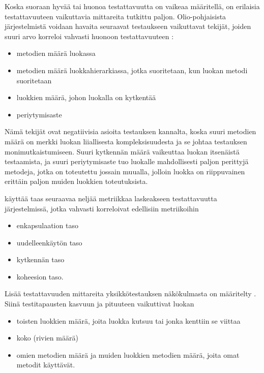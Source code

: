 \documentclass[finnish]{tktltiki2}
\theoremstyle{definition}
\theoremstyle{remark}
\begin{document}
Koska suoraan hyvää tai huonoa testattavuutta on vaikeaa määritellä, on erilaisia testattavuuteen vaikuttavia mittareita tutkittu paljon. Olio-pohjaisista järjestelmistä voidaan havaita seuraavat testaukseen vaikuttavat tekijät, joiden suuri arvo korreloi vahvasti huonoon testattavuuteen \citep[s. 5]{Dubey:2011:AMM:2020976.2020983}:

\begin{itemize}
	\item metodien määrä luokassa
	\item metodien määrä luokkahierarkiassa, jotka suoritetaan, kun luokan metodi suoritetaan
	\item luokkien määrä, johon luokalla on kytkentää
	\item periytymisaste
\end{itemize}

\noindent
Nämä tekijät ovat negatiivisia asioita testauksen kannalta, koska suuri metodien määrä on merkki luokan liiallisesta kompleksisuudesta ja se johtaa testauksen monimutkaistumiseen. Suuri kytkennän määrä vaikeuttaa luokan itsenäistä testaamista, ja suuri periytymisaste tuo luokalle mahdollisesti paljon perittyjä metodeja, jotka on toteutettu jossain muualla, jolloin luokka on riippuvainen erittäin paljon muiden luokkien toteutuksista. 

\citep[s. 3-4]{Khan:2009:MBT:1507195.1507204} käyttää taas seuraavaa neljää metriikkaa laskeakseen testattavuutta järjestelmissä, jotka vahvasti korreloivat edellisiin metriikoihin 

\begin{itemize}
	\item enkapsulaation taso
	\item uudelleenkäytön taso
	\item kytkennän taso
	\item koheesion taso.
\end{itemize}   


Lisää testattavuuden mittareita yksikkötestauksen näkökulmasta on määritelty \citep[s. 9]{Bruntink:2004}. Siinä testitapausten kasvuun ja pituuteen vaikuttivat luokan 

\begin{itemize}
	\item toisten luokkien määrä, joita luokka kutsuu tai jonka kenttiin se viittaa
	\item koko (rivien määrä)
	\item omien metodien määrä ja muiden luokkien metodien määrä, joita omat metodit käyttävät.
\end{itemize} 
\end{document}

